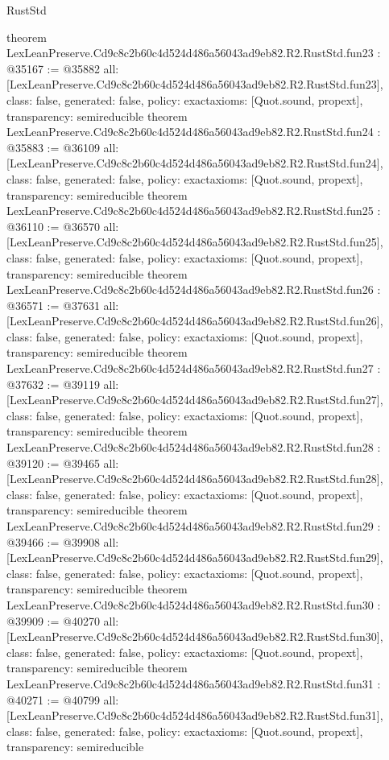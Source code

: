 \begin{lexlean}{RustStd}
\begin{coremodule}
{}
theorem LexLeanPreserve.Cd9c8c2b60c4d524d486a56043ad9eb82.R2.RustStd.fun23 : @35167 := @35882 {
  all: [LexLeanPreserve.Cd9c8c2b60c4d524d486a56043ad9eb82.R2.RustStd.fun23],
  class: false,
  generated: false,
  policy: exact{axioms: [Quot.sound, propext]},
  transparency: semireducible
}
theorem LexLeanPreserve.Cd9c8c2b60c4d524d486a56043ad9eb82.R2.RustStd.fun24 : @35883 := @36109 {
  all: [LexLeanPreserve.Cd9c8c2b60c4d524d486a56043ad9eb82.R2.RustStd.fun24],
  class: false,
  generated: false,
  policy: exact{axioms: [Quot.sound, propext]},
  transparency: semireducible
}
theorem LexLeanPreserve.Cd9c8c2b60c4d524d486a56043ad9eb82.R2.RustStd.fun25 : @36110 := @36570 {
  all: [LexLeanPreserve.Cd9c8c2b60c4d524d486a56043ad9eb82.R2.RustStd.fun25],
  class: false,
  generated: false,
  policy: exact{axioms: [Quot.sound, propext]},
  transparency: semireducible
}
theorem LexLeanPreserve.Cd9c8c2b60c4d524d486a56043ad9eb82.R2.RustStd.fun26 : @36571 := @37631 {
  all: [LexLeanPreserve.Cd9c8c2b60c4d524d486a56043ad9eb82.R2.RustStd.fun26],
  class: false,
  generated: false,
  policy: exact{axioms: [Quot.sound, propext]},
  transparency: semireducible
}
theorem LexLeanPreserve.Cd9c8c2b60c4d524d486a56043ad9eb82.R2.RustStd.fun27 : @37632 := @39119 {
  all: [LexLeanPreserve.Cd9c8c2b60c4d524d486a56043ad9eb82.R2.RustStd.fun27],
  class: false,
  generated: false,
  policy: exact{axioms: [Quot.sound, propext]},
  transparency: semireducible
}
theorem LexLeanPreserve.Cd9c8c2b60c4d524d486a56043ad9eb82.R2.RustStd.fun28 : @39120 := @39465 {
  all: [LexLeanPreserve.Cd9c8c2b60c4d524d486a56043ad9eb82.R2.RustStd.fun28],
  class: false,
  generated: false,
  policy: exact{axioms: [Quot.sound, propext]},
  transparency: semireducible
}
theorem LexLeanPreserve.Cd9c8c2b60c4d524d486a56043ad9eb82.R2.RustStd.fun29 : @39466 := @39908 {
  all: [LexLeanPreserve.Cd9c8c2b60c4d524d486a56043ad9eb82.R2.RustStd.fun29],
  class: false,
  generated: false,
  policy: exact{axioms: [Quot.sound, propext]},
  transparency: semireducible
}
theorem LexLeanPreserve.Cd9c8c2b60c4d524d486a56043ad9eb82.R2.RustStd.fun30 : @39909 := @40270 {
  all: [LexLeanPreserve.Cd9c8c2b60c4d524d486a56043ad9eb82.R2.RustStd.fun30],
  class: false,
  generated: false,
  policy: exact{axioms: [Quot.sound, propext]},
  transparency: semireducible
}
theorem LexLeanPreserve.Cd9c8c2b60c4d524d486a56043ad9eb82.R2.RustStd.fun31 : @40271 := @40799 {
  all: [LexLeanPreserve.Cd9c8c2b60c4d524d486a56043ad9eb82.R2.RustStd.fun31],
  class: false,
  generated: false,
  policy: exact{axioms: [Quot.sound, propext]},
  transparency: semireducible
}
\end{coremodule}
\end{lexlean}
